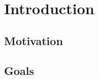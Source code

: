 \chapter{Introduction}
\label{chap:intro}



\section{Motivation}
\label{sec:motivation}


\section{Goals}
\label{sec:goals}







